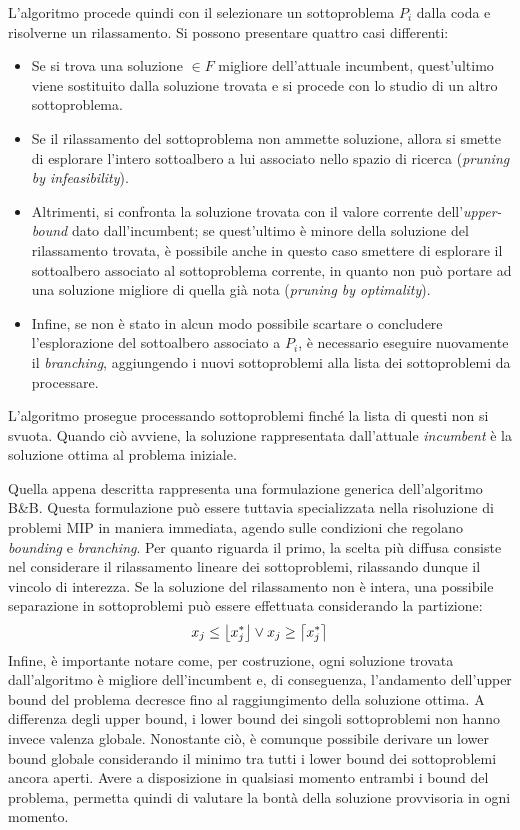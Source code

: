 L'algoritmo procede quindi con il selezionare un sottoproblema $P_i$ dalla coda e risolverne un rilassamento. Si possono presentare quattro casi differenti:
\begin{itemize}
\itemsep-0.5em 
\item Se si trova una soluzione $\in F$ migliore dell'attuale incumbent, quest'ultimo viene 
sostituito dalla soluzione trovata e si procede con lo studio di un altro sottoproblema.
\item Se il rilassamento del sottoproblema non ammette soluzione, allora si smette di esplorare l'intero sottoalbero a lui associato 
nello spazio di ricerca (\textit{pruning by infeasibility}).
\item Altrimenti, si confronta la soluzione trovata con il valore corrente dell'\textit{upper-bound} dato dall'incumbent; se
quest'ultimo è minore della soluzione del rilassamento trovata, è possibile anche in questo caso smettere di esplorare il sottoalbero associato al
sottoproblema corrente, in quanto non può portare ad una soluzione migliore di quella già nota (\textit{pruning by optimality}).
\item Infine, se non è stato in alcun modo possibile scartare o concludere l'esplorazione del sottoalbero associato a $P_i$, è necessario
eseguire nuovamente il \textit{branching}, aggiungendo i nuovi sottoproblemi alla lista dei sottoproblemi da processare.
\end{itemize}
L'algoritmo prosegue processando sottoproblemi finché la lista di questi non si svuota. Quando ciò avviene, la soluzione
rappresentata dall'attuale \textit{incumbent} è la soluzione ottima al problema iniziale.

Quella appena descritta rappresenta una formulazione generica dell'algoritmo B\&B. Questa formulazione può essere
tuttavia specializzata nella risoluzione di problemi MIP in maniera immediata, agendo sulle condizioni che regolano 
\textit{bounding} e \textit{branching}. Per quanto riguarda il primo, la scelta più diffusa consiste nel considerare
il rilassamento lineare dei sottoproblemi, rilassando dunque il vincolo di interezza.
Se la soluzione del rilassamento non è intera, una possibile separazione in sottoproblemi può essere effettuata considerando la partizione:
\begin{align*}
x_j \leq \floor*{x_j^*} \vee x_j \geq \ceil*{x_j^*}
\end{align*}
\indent
Infine, è importante notare come, per costruzione, ogni soluzione trovata dall'algoritmo è migliore dell'incumbent e, di conseguenza, 
l'andamento dell'upper bound del problema decresce fino al raggiungimento della soluzione ottima. A differenza degli upper bound, i lower bound 
dei singoli sottoproblemi non hanno invece valenza globale. Nonostante ciò, è comunque possibile derivare un lower bound globale considerando il minimo 
tra tutti i lower bound dei sottoproblemi ancora aperti. Avere a disposizione in qualsiasi momento entrambi i bound del problema, 
permetta quindi di valutare la bontà della soluzione provvisoria in ogni momento. 

